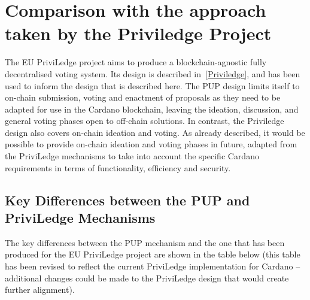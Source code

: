 \section{Comparison with the approach taken by the Priviledge Project}
\label{sect:priviledge}

The EU PriviLedge project aims to produce a blockchain-agnostic fully decentralised voting system.
Its design is described in~\ref{Priviledge}, and has been used to inform the design that is described here.
The PUP design limits itself to on-chain submission, voting and enactment of proposals as they need to be
adapted for use in the Cardano blockchain, leaving the ideation, discussion, and general voting phases open to off-chain solutions.
In contrast, the Priviledge design also covers on-chain ideation and voting.
As already described, it would be possible to provide on-chain ideation and voting phases in future, adapted from the PriviLedge
mechanisms to take into account the specific Cardano requirements in terms of functionality, efficiency and security.

\subsection{Key Differences between the PUP and PriviLedge Mechanisms}

The key differences between the PUP mechanism and the one that has been produced for the EU PriviLedge project are shown in the table below
(this table has been revised to reflect the current PriviLedge implementation for Cardano -- additional changes could be made to the PriviLedge design
that would create further alignment).

